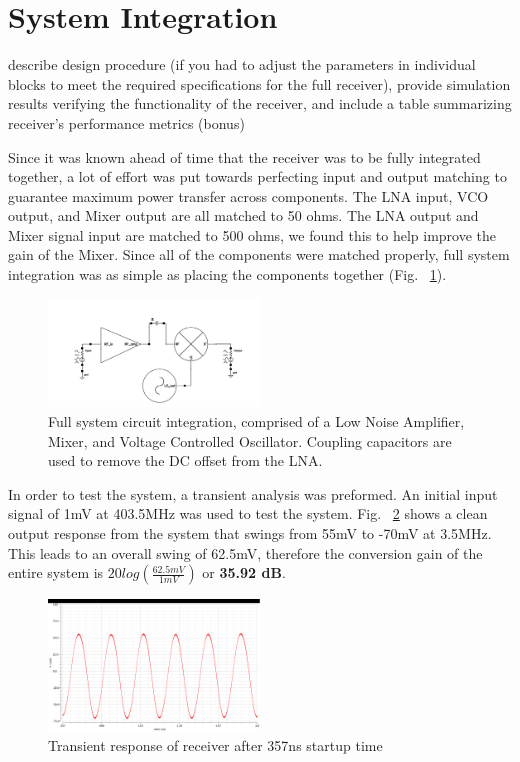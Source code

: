 \section{System Integration}

describe design procedure (if you had to adjust the parameters in individual blocks to meet the required specifications for the full receiver), provide simulation results verifying the functionality of the receiver, and include a table summarizing receiver’s performance metrics (bonus) 

Since it was known ahead of time that the receiver was to be fully integrated together, a lot of effort was put towards perfecting input and output matching to guarantee maximum power transfer across components. The LNA input, VCO output, and Mixer output are all matched to 50 ohms. The LNA output and Mixer signal input are matched to 500 ohms, we found this to help improve the gain of the Mixer. Since all of the components were matched properly, full system integration was as simple as placing the components together (Fig. ~\ref{fig:fullsystem}). 

\begin{figure}[h]
   \centering
    \includegraphics[width=0.5\textwidth]{figures/FullSystem.png}
    \caption{ Full system circuit integration, comprised of a Low Noise Amplifier, Mixer, and Voltage Controlled Oscillator. Coupling capacitors are used to remove the DC offset from the LNA.  }
    \label{fig:fullsystem}
\end{figure}

In order to test the system, a transient analysis was preformed. An initial input signal of 1mV at 403.5MHz was used to test the system. Fig. ~\ref{fig:fullsystemtrans} shows a clean output response from the system that swings from 55mV to -70mV at 3.5MHz. This leads to an overall swing of 62.5mV, therefore the conversion gain of the entire system is $20log(\frac{62.5mV}{1mV})$ or {\bf 35.92 dB}.

\begin{figure}[h]
   \centering
    \includegraphics[width=0.5\textwidth]{figures/FullSystemTrans}
    \caption{ Transient response of receiver after 357ns startup time }
    \label{fig:fullsystemtrans}
\end{figure}

